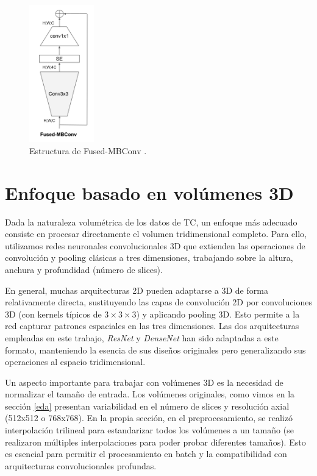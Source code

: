 \begin{figure}[!htbp]
    \centering
    \includegraphics[width=0.25\textwidth]{img/efficientnetv2.png}
    \caption{Estructura de Fused-MBConv \parencite{tan2021efficientnetv2}.}
    \label{fig:efficientnetv2}
\end{figure}


\section{Enfoque basado en volúmenes 3D}

Dada la naturaleza volumétrica de los datos de TC, un enfoque más adecuado consiste en procesar directamente el volumen tridimensional completo. Para ello, utilizamos redes neuronales convolucionales 3D que extienden las operaciones de convolución y pooling clásicas a tres dimensiones, trabajando sobre la altura, anchura y profundidad (número de slices).

En general, muchas arquitecturas 2D pueden adaptarse a 3D de forma relativamente directa, sustituyendo las capas de convolución 2D por convoluciones 3D (con kernels típicos de $3 \times 3 \times 3$) y aplicando pooling 3D. Esto permite a la red capturar patrones espaciales en las tres dimensiones. Las dos arquitecturas empleadas en este trabajo, \textit{ResNet} y \textit{DenseNet} han sido adaptadas a este formato, manteniendo la esencia de sus diseños originales pero generalizando sus operaciones al espacio tridimensional.

Un aspecto importante para trabajar con volúmenes 3D es la necesidad de normalizar el tamaño de entrada. Los volúmenes originales, como vimos en la sección \ref{eda} presentan variabilidad en el número de slices y resolución axial (512x512 o 768x768). En la propia sección, en el preprocesamiento, se realizó interpolación trilineal para estandarizar todos los volúmenes a un tamaño (se realizaron múltiples interpolaciones para poder probar diferentes tamaños). Esto es esencial para permitir el procesamiento en batch y la compatibilidad con arquitecturas convolucionales profundas.

